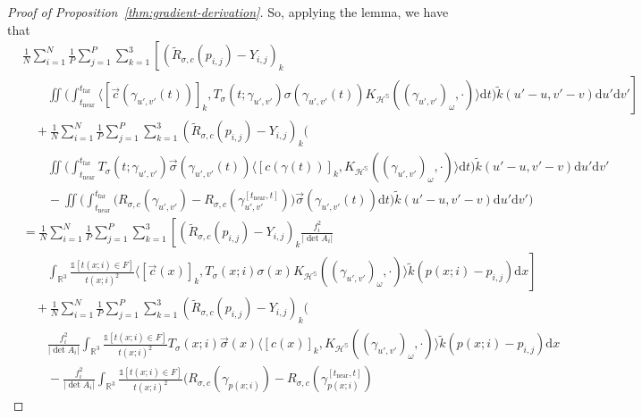 \documentclass{article}
\newcommand{\R}{\mathbb{R}}
\newcommand{\ind}{\mathds{1}}
\newcommand{\dif}{\mathrm{d}}
\newcommand{\render}{{R}}
\newcommand{\near}{\mathrm{near}}
\newcommand{\far}{\mathrm{far}}
\begin{document}
\begin{proof}[Proof of Proposition~\ref{thm:gradient-derivation}]
    So, applying the lemma, we have that
    {\small
    \begin{align*}
        & \frac{1}{N} \sum_{i=1}^N \frac{1}{P} \sum_{j=1}^P \sum_{k=1}^3 \left[ ( \widetilde{\render}_{\sigma,c}(p_{i,j}) - Y_{i,j} )_k \right.
        \\ &\qquad \left. \iint \biggl(
            \int_{t_\near}^{t_\far}
                \langle [\vec{c}(\gamma_{u',v'}(t))]_k, T_{\sigma}(t;\gamma_{u',v'}) \sigma(\gamma_{u',v'}(t)) K_{\mathcal{H}^\mathbb{S}}((\gamma_{u',v'})_\omega, \cdot) \rangle
            \dif t \biggr) \widetilde{k}(u'-u,v'-v) \dif u' \dif v' \right]
        \\ &\quad + \frac{1}{N} \sum_{i=1}^N \frac{1}{P} \sum_{j=1}^P \sum_{k=1}^3 ( \widetilde{\render}_{\sigma,c}(p_{i,j}) - Y_{i,j} )_k \Biggl(
        \\ &\qquad \iint \biggl(
            \int_{t_\near}^{t_\far}
                T_{\sigma}(t;\gamma_{u',v'}) \vec{\sigma}(\gamma_{u',v'}(t))
                \langle [c(\gamma(t))]_k, K_{\mathcal{H}^\mathbb{S}}((\gamma_{u',v'})_\omega, \cdot) \rangle \dif t \biggr) \widetilde{k}(u'-u,v'-v) \dif u' \dif v'
            \\ &\qquad - \iint \biggl( \int_{t_\near}^{t_\far} \bigl( \render_{\sigma,c}(\gamma_{u',v'}) - \render_{\sigma,c}(\gamma_{u',v'}^{[t_\near, t]})
            \bigr) \vec{\sigma}(\gamma_{u',v'}(t)) \dif t
        \biggr) \widetilde{k}(u'-u,v'-v) \dif u' \dif v' \Biggr)
        \\ &= \frac{1}{N} \sum_{i=1}^N \frac{1}{P} \sum_{j=1}^P \sum_{k=1}^3 \left[ ( \widetilde{\render}_{\sigma,c}(p_{i,j}) - Y_{i,j} )_k \frac{f_i^2}{\lvert \det A_i \rvert} \right.
        \\ &\qquad \left. \int_{\R^3} \frac{\ind[t(x;i) \in F]}{t(x;i)^2}
                \langle [\vec{c}(x)]_k, T_{\sigma}(x;i) \sigma(x) K_{\mathcal{H}^\mathbb{S}}((\gamma_{u',v'})_\omega, \cdot) \rangle
            \widetilde{k}(p(x;i)-p_{i,j}) \dif x \right]
        \\ &\quad + \frac{1}{N} \sum_{i=1}^N \frac{1}{P} \sum_{j=1}^P \sum_{k=1}^3 ( \widetilde{\render}_{\sigma,c}(p_{i,j}) - Y_{i,j} )_k \Biggl(
        \\ &\qquad \frac{f_i^2}{\lvert \det A_i \rvert} \int_{\R^3} \frac{\ind[t(x;i) \in F]}{t(x;i)^2}
                T_{\sigma}(x;i) \vec{\sigma}(x)
                \langle [c(x)]_k, K_{\mathcal{H}^\mathbb{S}}((\gamma_{u',v'})_\omega, \cdot) \rangle \widetilde{k}(p(x;i)-p_{i,j}) \dif x
            \\ &\qquad - \frac{f_i^2}{\lvert \det A_i \rvert} \int_{\R^3} \frac{\ind[t(x;i) \in F]}{t(x;i)^2} \bigl( \render_{\sigma,c}(\gamma_{p(x;i)}) - \render_{\sigma,c}(\gamma_{p(x;i)}^{[t_\near, t]})

\end{align*}}
\end{proof}
\end{document}
